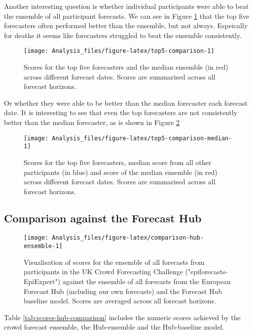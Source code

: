 \documentclass[
]{article}
\begin{document}
Another interesting question is whether individual participants were able to beat the ensemble of all participant forecasts. We can see in Figure \ref{fig:top5-comparison} that the top five forecasters often performed better than the ensemble, but not always. Espeically for deaths it seems like forecasters struggled to beat the ensemble consistently.

\begin{figure}
\texttt{[image: Analysis\_files/figure-latex/top5-comparison-1]} \caption{Scores for the top five forecasters and the median ensemble (in red) across different forecast dates. Scores are summarised across all forecast horizons.}\label{fig:top5-comparison}
\end{figure}

Or whether they were able to be better than the median forecaster each forecast date. It is interesting to see that even the top forecasters are not consistently better than the median forecaster, as is shown in Figure \ref{fig:top5-comparison-median}

\begin{figure}
\texttt{[image: Analysis\_files/figure-latex/top5-comparison-median-1]} \caption{Scores for the top five forecasters, median score from all other participants (in blue) and score of the median ensemble (in red) across different forecast dates. Scores are summarised across all forecast horizons.}\label{fig:top5-comparison-median}
\end{figure}

\hypertarget{comparison-against-the-forecast-hub}{%
\subsection{Comparison against the Forecast Hub}\label{comparison-against-the-forecast-hub}}

\begin{figure}
\texttt{[image: Analysis\_files/figure-latex/comparison-hub-ensemble-1]} \caption{Visualisation of scores for the ensemble of all forecasts from participants in the UK Crowd Forecasting Challenge ("epiforecasts-EpiExpert") against the ensemble of all forecasts from the European Forecast Hub (including our own forecasts) and the Forecast Hub baseline model. Scores are averaged across all forecast horizons.}\label{fig:comparison-hub-ensemble}
\end{figure}

Table \ref{tab:scores-hub-comparison} includes the numeric scores achieved by the crowd forecast ensemble, the Hub-ensemble and the Hub-baseline model.
\end{document}
